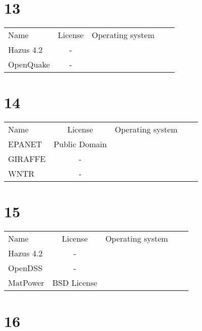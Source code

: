 \section{13}

\begin{table}[]
    \centering
    \begin{tabular}{l|cccc}
    \toprule
    Name &  License & Operating system\\
        Hazus 4.2 & - &\\
        OpenQuake & - &\\

    \bottomrule
    \end{tabular}
    \end{table}

\section{14}

\begin{table}[]
    \centering
    \begin{tabular}{l|cccc}
    \toprule
    Name &  License & Operating system\\
        EPANET &  Public Domain &\\
        GIRAFFE & - &\\
        WNTR & - &\\

    \bottomrule
    \end{tabular}
    \end{table}

\section{15}

\begin{table}[]
    \centering
    \begin{tabular}{l|cccc}
    \toprule
    Name &  License & Operating system\\
        Hazus 4.2 & - &\\
        OpenDSS & - &\\
        MatPower &  BSD License &\\

    \bottomrule
    \end{tabular}
    \end{table}

\section{16}

